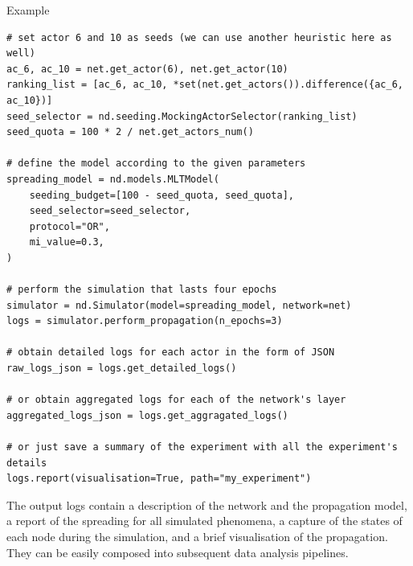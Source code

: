 \documentclass[final]{beamer}
\newlength{\colwidth}
\begin{document}
\begin{frame}[t, fragile]
\begin{columns}[t]
\begin{column}{\colwidth}
\begin{exampleblock}{Example}
\begin{lstlisting}[style=py, basicstyle=\footnotesize\ttfamily]
# set actor 6 and 10 as seeds (we can use another heuristic here as well)
ac_6, ac_10 = net.get_actor(6), net.get_actor(10)
ranking_list = [ac_6, ac_10, *set(net.get_actors()).difference({ac_6, ac_10})]
seed_selector = nd.seeding.MockingActorSelector(ranking_list)
seed_quota = 100 * 2 / net.get_actors_num()

# define the model according to the given parameters
spreading_model = nd.models.MLTModel(
    seeding_budget=[100 - seed_quota, seed_quota],
    seed_selector=seed_selector,
    protocol="OR",
    mi_value=0.3,  
)

# perform the simulation that lasts four epochs
simulator = nd.Simulator(model=spreading_model, network=net)
logs = simulator.perform_propagation(n_epochs=3)

# obtain detailed logs for each actor in the form of JSON
raw_logs_json = logs.get_detailed_logs()

# or obtain aggregated logs for each of the network's layer
aggregated_logs_json = logs.get_aggragated_logs()

# or just save a summary of the experiment with all the experiment's details
logs.report(visualisation=True, path="my_experiment")
\end{lstlisting}


The output logs contain a description of the network and the propagation model, a report of the
spreading for all simulated phenomena, a capture of the states of each node during the simulation,
and a brief visualisation of the propagation. They can be easily composed into subsequent data
analysis pipelines.


\end{exampleblock}
\end{column}
\end{columns}
\end{frame}
\end{document}
